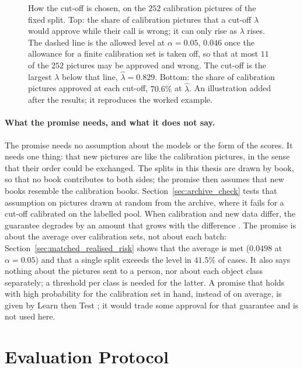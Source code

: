 \begin{figure}[!htbp]
\centering
{}
\caption[How the cut-off is chosen]{How the cut-off is chosen, on the $252$ calibration pictures of the fixed split. Top: the share of calibration pictures that a cut-off $\lambda$ would approve while their call is wrong; it can only rise as $\lambda$ rises. The dashed line is the allowed level at $\alpha = 0.05$, $0.046$ once the allowance for a finite calibration set is taken off, so that at most $11$ of the $252$ pictures may be approved and wrong. The cut-off is the largest $\lambda$ below that line, $\hat\lambda = 0.829$. Bottom: the share of calibration pictures approved at each cut-off, $70.6\%$ at $\hat\lambda$. An illustration added after the results; it reproduces the worked example.}
\label{fig:crc_cutoff_curve}
\end{figure}

\paragraph{What the promise needs, and what it does not say.} The promise needs no assumption about the models or the form of the scores. It needs one thing: that new pictures are like the calibration pictures, in the sense that their order could be exchanged. The splits in this thesis are drawn by book, so that no book contributes to both sides; the promise then assumes that new books resemble the calibration books. Section~\ref{sec:archive_check} tests that assumption on pictures drawn at random from the archive, where it fails for a cut-off calibrated on the labelled pool. When calibration and new data differ, the guarantee degrades by an amount that grows with the difference \cite{barber2023beyond}. The promise is about the average over calibration sets, not about each batch: Section~\ref{sec:matched_realised_risk} shows that the average is met ($0.0498$ at $\alpha = 0.05$) and that a single split exceeds the level in $41.5\%$ of cases. It also says nothing about the pictures sent to a person, nor about each object class separately; a threshold per class is needed for the latter. A promise that holds with high probability for the calibration set in hand, instead of on average, is given by Learn then Test \cite{angelopoulos2021ltt}; it would trade some approval for that guarantee and is not used here.

\section{Evaluation Protocol}
\label{sec:corrected_protocol}

